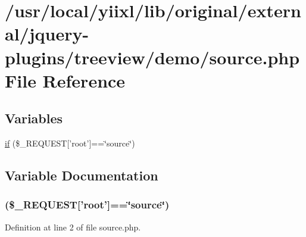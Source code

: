 \hypertarget{source_8php}{
\section{/usr/local/yiixl/lib/original/external/jquery-\/plugins/treeview/demo/source.php File Reference}
\label{source_8php}
}
\subsection*{Variables}
\begin{DoxyCompactItemize}
\item 
\hyperlink{source_8php_aeb89c9ba506f3ad9fef3bf49a5f5e252}{if} (\$\_\-REQUEST\mbox{[}'root'\mbox{]}==\char`\"{}source\char`\"{})
\end{DoxyCompactItemize}


\subsection{Variable Documentation}
\hypertarget{source_8php_aeb89c9ba506f3ad9fef3bf49a5f5e252}{
\subsubsection[{if}]{(\$\_\-REQUEST\mbox{[}'root'\mbox{]}==\char`\"{}source\char`\"{})}}
\label{source_8php_aeb89c9ba506f3ad9fef3bf49a5f5e252}


Definition at line 2 of file source.php.


